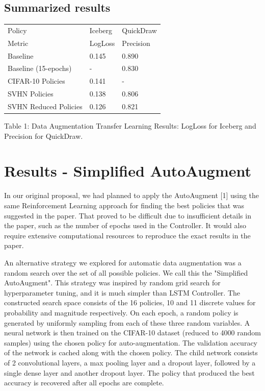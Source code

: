 \documentclass[10pt,twocolumn,letterpaper]{article}
\begin{document}
\subsection{Summarized results}
		\begin{table}[h]
			\begin{tabular}{lll}
				\hline
				Policy &Iceberg &QuickDraw   \\ 
				Metric &LogLoss &Precision   \\ \hline
				Baseline  &0.145 &0.890\\
				Baseline (15-epochs) &-  &0.830\\
				CIFAR-10 Policies &0.141  &-\\ 
				SVHN Policies	&0.138  &0.806\\
				SVHN Reduced Policies	&0.126  &0.821\\	
				\hline
			\end{tabular}
		\end{table}
Table 1: Data Augmentation Transfer Learning Results: LogLoss for Iceberg and Precision for QuickDraw.

\section{Results - Simplified AutoAugment}


In our original proposal, we had planned to apply the AutoAugment [1] using the same Reinforcement Learning approach for finding the best policies that was suggested in the paper.  That proved to be difficult due to insufficient details in the paper, such as the number of epochs used in the Controller.  It would also require extensive computational resources to reproduce the exact results in the paper.

An alternative strategy we explored for automatic data augmentation was a random search over the set of all possible policies. We call this the "Simplified AutoAugment".  This strategy was inspired by random grid search for hyperparameter tuning, and it is much simpler than LSTM Controller. The constructed search space consists of the 16 policies, 10 and 11 discrete values for probability and magnitude respectively. On each epoch, a random policy is generated by uniformly sampling from each of these three random variables. A neural network is then trained on the CIFAR-10 dataset (reduced to 4000 random samples) using the chosen policy for auto-augmentation. The validation accuracy of the network is cached along with the chosen policy. The child network consists of 2 convolutional layers, a max pooling layer and a dropout layer, followed by a single dense layer and another dropout layer. The policy that produced the best accuracy is recovered after all epochs are complete.
\end{document}
